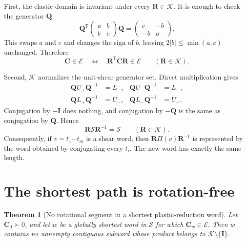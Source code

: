 \documentclass[11pt]{article}
\newcommand{\trans}{\mathsf{T}}
\newcommand{\E}{\mathcal E}
\newcommand{\K}{\mathcal K}
\newcommand{\Sset}{\mathcal S}
\newcommand{\wordprod}{\Pi}
\newcommand{\Uplus}{U_{+}}
\newcommand{\Uminus}{U_{-}}
\newcommand{\Lplus}{L_{+}}
\newcommand{\Lminus}{L_{-}}
\newtheorem{theorem}{Theorem}
\theoremstyle{definition}
\begin{document}
First, the elastic domain is invariant under every \(\mathbf R\in\K\).  It
is enough to check the generator \(\mathbf Q\):
\begin{equation}
 \mathbf Q^\trans
 \begin{pmatrix}a&b\\b&c\end{pmatrix}
 \mathbf Q
 =\begin{pmatrix}c&-b\\-b&a\end{pmatrix}.
 \label{eq:domaininvariance}
\end{equation}
This swaps \(a\) and \(c\) and changes the sign of \(b\), leaving
\(2|b|\leq\min(a,c)\) unchanged.  Therefore
\begin{equation}
 \mathbf C\in\E
 \quad\Longleftrightarrow\quad
 \mathbf R^\trans\mathbf C\mathbf R\in\E
 \qquad(\mathbf R\in\K).
 \label{eq:Einvariant}
\end{equation}

Second, \(\K\) normalizes the unit-shear generator set.  Direct multiplication
gives
\begin{equation}
 \begin{aligned}
 \mathbf Q\Uplus\mathbf Q^{-1}&=\Lminus,&
 \mathbf Q\Uminus\mathbf Q^{-1}&=\Lplus,\\
 \mathbf Q\Lplus\mathbf Q^{-1}&=\Uminus,&
 \mathbf Q\Lminus\mathbf Q^{-1}&=\Uplus.
 \end{aligned}
 \label{eq:conjugation}
\end{equation}
Conjugation by \(-\mathbf I\) does nothing, and conjugation by
\(-\mathbf Q\) is the same as conjugation by \(\mathbf Q\).  Hence
\begin{equation}
 \mathbf R\Sset\mathbf R^{-1}=\Sset
 \qquad(\mathbf R\in\K).
 \label{eq:normalizes}
\end{equation}
Consequently, if \(v=t_1\cdots t_m\) is a shear word, then
\(\mathbf R\wordprod(v)\mathbf R^{-1}\) is represented by the word obtained
by conjugating every \(t_i\).  The new word has exactly the same length.

\section{The shortest path is rotation-free}

\begin{theorem}[No rotational segment in a shortest plastic-reduction word]
Let \(\mathbf C_0\succ0\), and let \(w\) be a globally shortest word in
\(\Sset\) for which \(\mathbf C_w\in\E\).  Then \(w\) contains no nonempty
contiguous subword whose product belongs to
\(\K\setminus\{\mathbf I\}\).
\label{thm:main}
\end{theorem}
\end{document}
